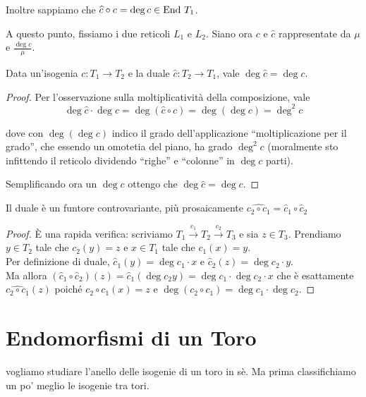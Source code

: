 	Inoltre sappiamo che $\widehat c \circ c = \deg c \in \mbox{End } T_1$.

	A questo punto, fissiamo i due reticoli $L_1$ e $L_2$. Siano ora $c$ e $\hat c$ rappresentate da $\mu$ e $\frac{\deg c}\mu$.

    \begin{proposizione}
        Data un'isogenia $c:T_1\to T_2$ e la duale $\hat c:T_2\to T_1$, vale $\deg\hat c=\deg c$.
    \end{proposizione}
    \begin{proof}
        Per l'osservazione sulla moltiplicatività della composizione, vale
    	\[
    		\deg \hat c \cdot \deg c = \deg(\hat c \circ c) = \deg(\deg c) = \deg^2 c
    	\]

    	dove con $\deg(\deg c)$ indico il grado dell'applicazione ``moltiplicazione per il grado'', che essendo un omotetia del piano, ha grado $\deg^2 c$ (moralmente sto infittendo il reticolo dividendo ``righe'' e ``colonne'' in $\deg c$ parti).

    	Semplificando ora un $\deg c$ ottengo che $\deg \hat c = \deg c$.
    \end{proof}


    \begin{proposizione}
        Il duale è un funtore controvariante, più prosaicamente $\hat{c_2 \circ c_1} = \hat c_1 \circ \hat c_2$
    \end{proposizione}
    \begin{proof}
        È una rapida verifica: scriviamo $T_1\xrightarrow{c_1}T_2\xrightarrow{c_2}T_3$ e sia $z\in T_3$. Prendiamo $y\in T_2$ tale che $c_2(y)=z$ e $x\in T_1$ tale che $c_1(x)=y$.\\
         Per definizione di duale, $\hat c_1(y)=\deg c_1\cdot x$ e $\hat c_2(z)=\deg c_2\cdot y$.\\
        Ma allora $(\hat c_1\circ\hat c_2)(z)=\hat c_1(\deg c_2 y)=\deg c_1\cdot\deg c_2 \cdot x$ che è esattamente $\hat{c_2\circ c_1}(z)$ poiché $c_2\circ c_1(x)=z$ e $\deg(c_2\circ c_1)=\deg c_1\cdot\deg c_2$.
    \end{proof}


\section{Endomorfismi di un Toro}
     vogliamo studiare l'anello delle isogenie di un toro in sè. Ma prima classifichiamo un po' meglio le isogenie tra tori.

